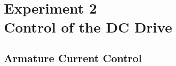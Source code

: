 \documentclass[12pt,a4paper, openany]{book}
\begin{document}




\setcounter{chapter}{1} %
\chapter{Experiment 2 \\ Control of the DC Drive}

 \setcounter{section}{2} %
\section{Armature Current Control}
\end{document}
